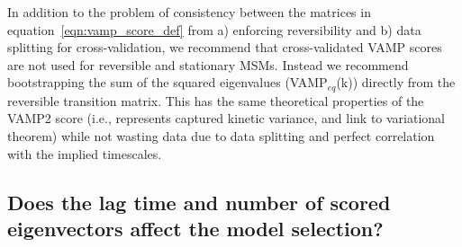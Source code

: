 \documentclass[journal=jacsat,manuscript=article]{achemso}
\begin{document}
In addition to the problem of consistency between the matrices in equation~\ref{eqn:vamp_score_def} from a) enforcing reversibility and b) data splitting for cross-validation, we recommend that cross-validated VAMP scores are not used for reversible and stationary MSMs.  Instead we recommend bootstrapping the sum of the squared eigenvalues (VAMP$_{eq}$(k)) directly from the reversible transition matrix. This has the same theoretical properties of the VAMP2 score (i.e., represents captured kinetic variance, and link to variational theorem) while not wasting data due to data splitting and perfect correlation with the implied timescales. 

\subsection{Does the lag time and number of scored eigenvectors affect the model selection?}
\end{document}
